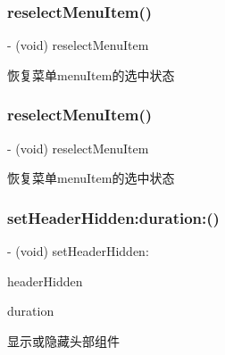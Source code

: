 \subsubsection{\texorpdfstring{reselect\+Menu\+Item()}{reselectMenuItem()}\hspace{0.1cm}{\footnotesize\ttfamily [2/3]}}
{\footnotesize\ttfamily -\/ (void) reselect\+Menu\+Item \begin{DoxyParamCaption}{ }\end{DoxyParamCaption}}

恢复菜单menu\+Item的选中状态 \mbox{\label{interface_v_t_magic_view_afd5ddee2cccae141176cd44b737f9444}} 
\subsubsection{\texorpdfstring{reselect\+Menu\+Item()}{reselectMenuItem()}\hspace{0.1cm}{\footnotesize\ttfamily [3/3]}}
{\footnotesize\ttfamily -\/ (void) reselect\+Menu\+Item \begin{DoxyParamCaption}{ }\end{DoxyParamCaption}}

恢复菜单menu\+Item的选中状态 \mbox{\label{interface_v_t_magic_view_ac8808d94ff7db43424b201f33935c488}} 
\subsubsection{\texorpdfstring{set\+Header\+Hidden\+:duration\+:()}{setHeaderHidden:duration:()}\hspace{0.1cm}{\footnotesize\ttfamily [1/3]}}
{\footnotesize\ttfamily -\/ (void) set\+Header\+Hidden\+: \begin{DoxyParamCaption}\item[{(B\+O\+OL)}]{header\+Hidden }\item[{duration:(C\+G\+Float)}]{duration }\end{DoxyParamCaption}}

显示或隐藏头部组件


